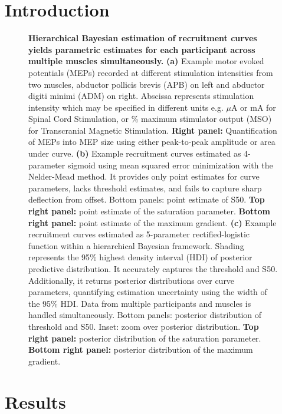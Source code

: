 \documentclass[sn-mathphys-ay]{sn-jnl}%
\theoremstyle{thmstyleone}%
\theoremstyle{thmstyletwo}%
\theoremstyle{thmstylethree}%
\begin{document}
\section{Introduction}\label{intro}

\begin{figure}[h]
    \centering
    \caption{\textbf{Hierarchical Bayesian estimation of recruitment curves yields parametric estimates for each participant across multiple muscles simultaneously.}  \textbf{(a)} Example motor evoked potentials (MEPs) recorded at different stimulation intensities from two muscles, abductor pollicis brevis (APB) on left and abductor digiti minimi (ADM) on right. Abscissa represents stimulation intensity which may be specified in different units e.g. $\mu$A or mA for Spinal Cord Stimulation, or \% maximum stimulator output (MSO) for Transcranial Magnetic Stimulation. \textbf{Right panel:} Quantification of MEPs into MEP size using either peak-to-peak amplitude or area under curve. \textbf{(b)} Example recruitment curves estimated as 4-parameter sigmoid using mean squared error minimization with the Nelder-Mead method. It provides only point estimates for curve parameters, lacks threshold estimates, and fails to capture sharp deflection from offset. Bottom panels: point estimate of S50. \textbf{Top right panel:} point estimate of the saturation parameter. \textbf{Bottom right panel:} point estimate of the maximum gradient. \textbf{(c)} Example recruitment curves estimated as 5-parameter rectified-logistic function within a hierarchical Bayesian framework. Shading represents the 95\% highest density interval (HDI) of posterior predictive distribution. It accurately captures the threshold and S50. Additionally, it returns posterior distributions over curve parameters, quantifying estimation uncertainty using the width of the 95\% HDI. Data from multiple participants and muscles is handled simultaneously. Bottom panels: posterior distribution of threshold and S50. Inset: zoom over posterior distribution. \textbf{Top right panel:} posterior distribution of the saturation parameter. \textbf{Bottom right panel:} posterior distribution of the maximum gradient.}\label{fig-intro}
\end{figure}

\section{Results}\label{results}
\end{document}

